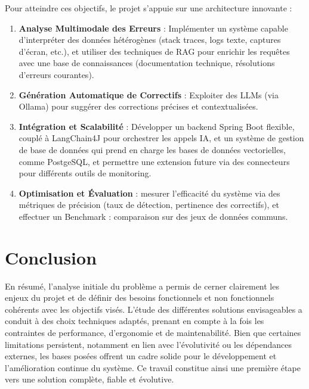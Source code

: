 \documentclass[12pt,a4paper]{report}
\begin{document}
	Pour atteindre ces objectifs, le projet s’appuie sur une architecture innovante :
	
	\begin{enumerate}
		\item \textbf{Analyse Multimodale des Erreurs} : Implémenter un système capable d’interpréter des données hétérogènes (stack traces, logs texte, captures d’écran, etc.), et utiliser des techniques de RAG pour enrichir les requêtes avec une base de connaissances (documentation technique, résolutions d’erreurs courantes).
		
		\item \textbf{Génération Automatique de Correctifs} : Exploiter des LLMs (via Ollama) pour suggérer des corrections précises et contextualisées.
		
		\item \textbf{Intégration et Scalabilité} : Développer un backend Spring Boot flexible, couplé à LangChain4J pour orchestrer les appels IA, et un système de gestion de base de données qui prend en charge les bases de données vectorielles, comme PostgeSQL, et permettre une extension future via des connecteurs pour différents outils de monitoring.
		
		\item \textbf{Optimisation et Évaluation} : mesurer l’efficacité du système via des métriques de précision (taux de détection, pertinence des correctifs), et effectuer un Benchmark : comparaison sur des jeux de données communs.
		
	\end{enumerate}
	
	\section{Conclusion}
	
	En résumé, l’analyse initiale du problème a permis de cerner clairement les enjeux du projet et de définir des besoins fonctionnels et non fonctionnels cohérents avec les objectifs visés. L’étude des différentes solutions envisageables a conduit à des choix techniques adaptés, prenant en compte à la fois les contraintes de performance, d’ergonomie et de maintenabilité. Bien que certaines limitations persistent, notamment en lien avec l’évolutivité ou les dépendances externes, les bases posées offrent un cadre solide pour le développement et l’amélioration continue du système. Ce travail constitue ainsi une première étape vers une solution complète, fiable et évolutive.
	
\end{document}
